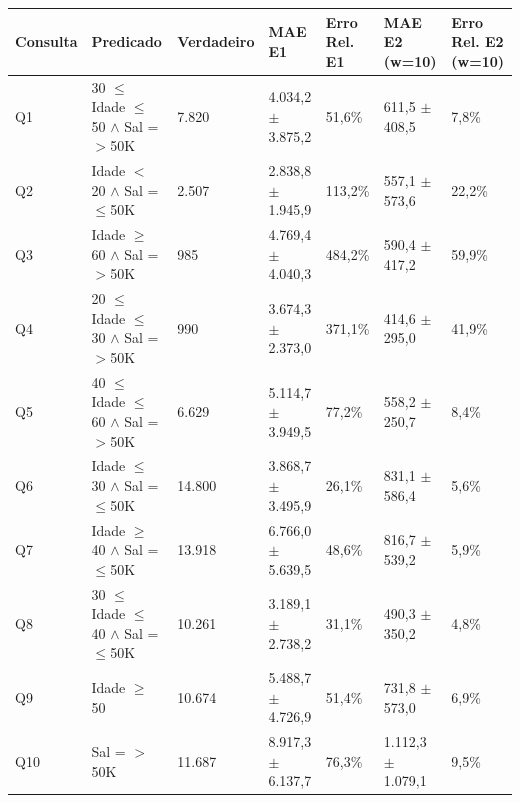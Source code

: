 \begin{tabular}{lllllll}
\toprule
Consulta & Predicado & Verdadeiro & MAE E1 & Erro Rel. E1 & MAE E2 (w=10) & Erro Rel. E2 (w=10) \\
\midrule
Q1 & 30 $\leq$ Idade $\leq$ 50 $\wedge$ Sal = $>$50K & 7.820 & 4.034,2 $\pm$ 3.875,2 & 51,6\% & 611,5 $\pm$ 408,5 & 7,8\% \\
Q2 & Idade $<$ 20 $\wedge$ Sal = $\leq$50K & 2.507 & 2.838,8 $\pm$ 1.945,9 & 113,2\% & 557,1 $\pm$ 573,6 & 22,2\% \\
Q3 & Idade $\geq$ 60 $\wedge$ Sal = $>$50K & 985 & 4.769,4 $\pm$ 4.040,3 & 484,2\% & 590,4 $\pm$ 417,2 & 59,9\% \\
Q4 & 20 $\leq$ Idade $\leq$ 30 $\wedge$ Sal = $>$50K & 990 & 3.674,3 $\pm$ 2.373,0 & 371,1\% & 414,6 $\pm$ 295,0 & 41,9\% \\
Q5 & 40 $\leq$ Idade $\leq$ 60 $\wedge$ Sal = $>$50K & 6.629 & 5.114,7 $\pm$ 3.949,5 & 77,2\% & 558,2 $\pm$ 250,7 & 8,4\% \\
Q6 & Idade $\leq$ 30 $\wedge$ Sal = $\leq$50K & 14.800 & 3.868,7 $\pm$ 3.495,9 & 26,1\% & 831,1 $\pm$ 586,4 & 5,6\% \\
Q7 & Idade $\geq$ 40 $\wedge$ Sal = $\leq$50K & 13.918 & 6.766,0 $\pm$ 5.639,5 & 48,6\% & 816,7 $\pm$ 539,2 & 5,9\% \\
Q8 & 30 $\leq$ Idade $\leq$ 40 $\wedge$ Sal = $\leq$50K & 10.261 & 3.189,1 $\pm$ 2.738,2 & 31,1\% & 490,3 $\pm$ 350,2 & 4,8\% \\
Q9 & Idade $\geq$ 50 & 10.674 & 5.488,7 $\pm$ 4.726,9 & 51,4\% & 731,8 $\pm$ 573,0 & 6,9\% \\
Q10 & Sal = $>$50K & 11.687 & 8.917,3 $\pm$ 6.137,7 & 76,3\% & 1.112,3 $\pm$ 1.079,1 & 9,5\% \\
\bottomrule
\end{tabular}
